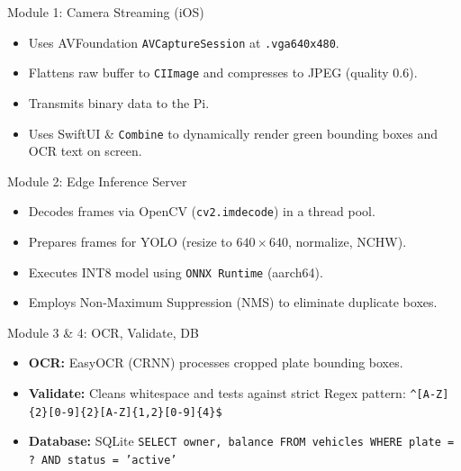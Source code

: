 \documentclass{beamer}
\begin{document}
\begin{frame}{Module 1: Camera Streaming (iOS)}
\begin{itemize}
    \item Uses AVFoundation \texttt{AVCaptureSession} at \texttt{.vga640x480}.
    \item Flattens raw buffer to \texttt{CIImage} and compresses to JPEG (quality 0.6).
    \item Transmits binary data to the Pi.
    \item Uses SwiftUI \& \texttt{Combine} to dynamically render green bounding boxes and OCR text on screen.
\end{itemize}
\end{frame}

\begin{frame}{Module 2: Edge Inference Server}
\begin{itemize}
    \item Decodes frames via OpenCV (\texttt{cv2.imdecode}) in a thread pool.
    \item Prepares frames for YOLO (resize to $640 \times 640$, normalize, NCHW).
    \item Executes INT8 model using \texttt{ONNX Runtime} (aarch64).
    \item Employs Non-Maximum Suppression (NMS) to eliminate duplicate boxes.
\end{itemize}
\end{frame}

\begin{frame}{Module 3 \& 4: OCR, Validate, DB}
\begin{itemize}
    \item \textbf{OCR:} EasyOCR (CRNN) processes cropped plate bounding boxes.
    \item \textbf{Validate:} Cleans whitespace and tests against strict Regex pattern: \texttt{\^{}[A-Z]\{2\}[0-9]\{2\}[A-Z]\{1,2\}[0-9]\{4\}\$}
    \item \textbf{Database:} SQLite \texttt{SELECT owner, balance FROM vehicles WHERE plate = ? AND status = 'active'}
\end{itemize}
\end{frame}
\end{document}
